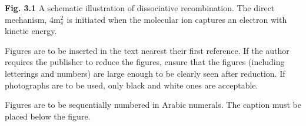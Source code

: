 \documentclass[twoside]{article}%
\begin{document}
\vspace*{-8pt}
\begin{center}
{\small {\bf Fig. 3.1} A schematic illustration of dissociative recombination. The
direct mechanism, 4m$^2_\pi$ is initiated when the
molecular ion captures an electron with kinetic energy.}
\end{center}
Figures are to be inserted in the text nearest their first reference.
If the author requires the publisher to reduce
the figures, ensure that the figures (including letterings and
numbers) are large enough to be clearly seen after reduction. If
photographs are to be used, only black and white ones are acceptable.

Figures are to be sequentially numbered in Arabic numerals. The
caption must be placed below the figure.



\end{document}
